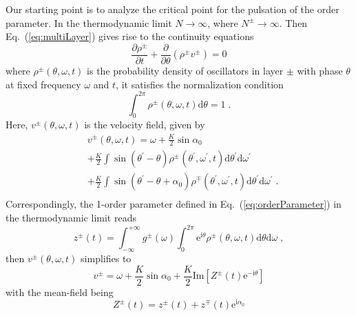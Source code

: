 \documentclass{article}
\begin{document}
Our starting point is to analyze the critical point for the pulsation of the order parameter.
In the thermodynamic limit $N\rightarrow \infty$, where $N^{\pm}\rightarrow \infty$. Then
Eq.~(\ref{eq:multiLayer}) gives rise to the continuity equations
\begin{equation}
    \label{eq:continuity}
    \frac{\partial \rho ^{\pm}}{\partial t}+\frac{\partial}{\partial \theta}\left( \rho ^{\pm}v^{\pm} \right) =0
\end{equation}
where $\rho ^{\pm}\left( \theta ,\omega ,t \right)$ is the probability density of oscillators in layer $\pm$ with phase $\theta$ at fixed frequency $\omega$ and $t$, it satisfies the normalization condition
\begin{equation}
    \label{eq:normalization}
    \int_{0}^{2\pi}{\rho ^{\pm}\left( \theta ,\omega ,t \right) \text{d}\theta} =1\;.
\end{equation}
Here, $v^{\pm}\left( \theta ,\omega ,t \right)$ is the velocity field, given by
\begin{equation}
    \begin{aligned}
        &v^{\pm}\left( \theta ,\omega ,t \right) =\omega +\frac{K}{2}\sin \alpha _0\\
        &+\frac{K}{2}\int{\sin \left( \theta ^{\prime}-\theta \right) \rho ^{\pm}\left( \theta ^{\prime},\omega ^{\prime},t \right) \text{d}\theta ^{\prime}\text{d}\omega ^{\prime}}\\
        &+\frac{K}{2}\int{\sin \left( \theta ^{\prime}-\theta +\alpha _0 \right) \rho ^{\mp}\left( \theta ^{\prime},\omega ^{\prime},t \right) \text{d}\theta ^{\prime}\text{d}\omega ^{\prime}}\;.\\
    \end{aligned}
\end{equation}
Correspondingly, the 1-order parameter defined in Eq.~(\ref{eq:orderParameter}) in the thermodynamic limit reads
\begin{equation}
    \label{eq:continuityZ}
    z^{\pm}\left( t \right) =\int_{-\infty}^{+\infty}{g^{\pm}(\omega)\int_0^{2\pi}{\text{e}^{\text{i}\theta}\rho ^{\pm}\left( \theta ,\omega ,t \right) \text{d}\theta \text{d}\omega}}\;,
\end{equation}
then $v^{\pm}\left( \theta ,\omega ,t \right)$ simplifies to
\begin{equation}
v^{\pm}=\omega +\frac{K}{2}\sin \alpha _0+\frac{K}{2}\mathrm{Im}\left[ Z^{\pm}\left( t \right) \mathrm{e}^{-\mathrm{i}\theta} \right] 
\end{equation}
with the mean-field being
\begin{equation}
    Z^{\pm}\left( t \right) =z^{\pm}\left( t \right) +z^{\mp}\left( t \right) \mathrm{e}^{\mathrm{i}\alpha _0}
\end{equation}
\end{document}

